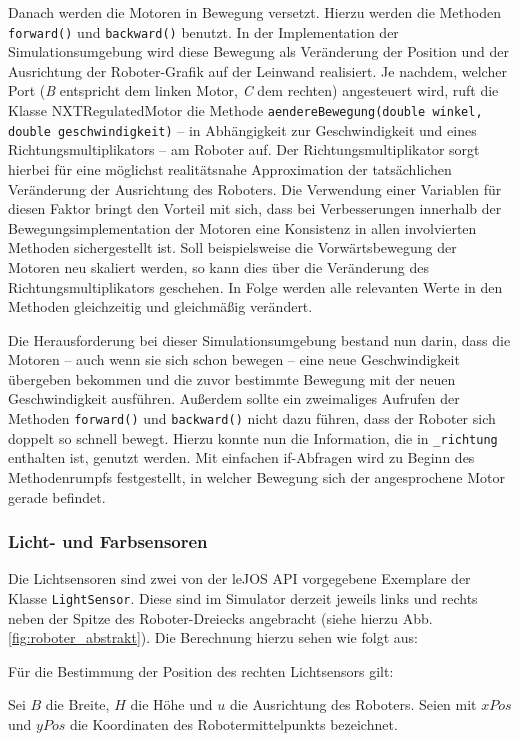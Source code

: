 \documentclass[paper=a4, DIV=calc, BCOR=12mm, twoside=on, onecolumn=on, open = right, titlepage =on, parskip =half-, headsepline = on, footsepline = off, chapterprefix = off, appendixprefix = on, fontsize = 12pt, numbers = noenddot, abstract = on]{scrbook}
\begin{document}
Danach werden die Motoren in Bewegung versetzt. Hierzu werden die Methoden \texttt{forward()} und \texttt{backward()} benutzt. In der Implementation der Simulationsumgebung wird diese Bewegung als Veränderung der Position und der Ausrichtung der Roboter-Grafik auf der Leinwand realisiert. Je nachdem, welcher Port (\emph{B} entspricht dem linken Motor, \emph{C} dem rechten) angesteuert wird, ruft die Klasse NXTRegulatedMotor die Methode \texttt{aendereBewegung(double winkel, double geschwindigkeit)} -- in Abhängigkeit zur Geschwindigkeit und eines Richtungsmultiplikators -- am Roboter auf. Der Richtungsmultiplikator sorgt hierbei für eine möglichst realitätsnahe Approximation der tatsächlichen Veränderung der Ausrichtung des Roboters. Die Verwendung einer Variablen für diesen Faktor bringt den Vorteil mit sich, dass bei Verbesserungen innerhalb der Bewegungsimplementation der Motoren eine Konsistenz in allen involvierten Methoden sichergestellt ist. Soll beispielsweise die Vorwärtsbewegung der Motoren neu skaliert werden, so kann dies über die Veränderung des Richtungsmultiplikators geschehen. In Folge werden alle relevanten Werte in den Methoden gleichzeitig und gleichmäßig verändert. 

Die Herausforderung bei dieser Simulationsumgebung bestand nun darin, dass die Motoren -- auch wenn sie sich schon bewegen -- eine neue Geschwindigkeit übergeben bekommen und die zuvor bestimmte Bewegung mit der neuen Geschwindigkeit ausführen. Außerdem sollte ein zweimaliges Aufrufen der Methoden \texttt{forward()} und \texttt{backward()} nicht dazu führen, dass der Roboter sich doppelt so schnell bewegt. Hierzu konnte nun die Information, die in  \texttt{{\_}richtung} enthalten ist, genutzt werden. Mit einfachen if-Abfragen wird zu Beginn des Methodenrumpfs festgestellt, in welcher Bewegung sich der angesprochene Motor gerade befindet. 


\subsubsection{Licht- und Farbsensoren}
Die Lichtsensoren sind zwei von der leJOS API vorgegebene Exemplare der Klasse \texttt{LightSensor}. Diese sind im Simulator derzeit jeweils links und rechts neben der Spitze des Roboter-Dreiecks angebracht (siehe hierzu Abb. \ref{fig:roboter_abstrakt}). Die Berechnung hierzu sehen wie folgt aus:

Für die Bestimmung der Position des rechten Lichtsensors gilt:

Sei $B$ die Breite, $H$ die Höhe und $u$ die Ausrichtung des Roboters. Seien mit $xPos$ und $yPos$ die Koordinaten des Robotermittelpunkts bezeichnet.
\end{document}
